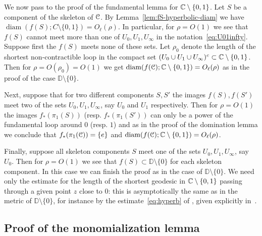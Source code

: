 \documentclass[reqno]{amsart}
\renewcommand\~[1]{\widetilde{#1}}
\def\diam{\operatorname{diam}} \def\ord{\operatorname{ord}}
\def\D{{\mathbb D}}
\begin{document}
We now pass to the proof of the fundamental lemma for
${\mathbb C}\setminus\{0,1\}$. Let $S$ be a component of the skeleton of
${\mathcal C}$. By Lemma~\ref{lem:fS-hyperbolic-diam} we have
$\diam(f(S);C\setminus\{0,1\})=O_\ell(\rho)$. In particular, for
$\rho=O(1)$ we see that $f(S)$ cannot meet more than one of
$U_0,U_1,U_\infty$ in the notation~\eqref{eq:U01infty}. Suppose first
the $f(S)$ meets none of these sets. Let $\rho_0$ denote the length of
the shortest non-contractible loop in the compact set
$(U_0\cup U_1\cup U_\infty)^c\subset{\mathbb C}\setminus\{0,1\}$. Then for
$\rho=O(\rho_0)=O(1)$ we get
$\diam(f(\cC);\C\setminus\{0,1\})=O_\ell(\rho)$ as in the proof of the
case $\D\setminus\{0\}$.

Next, suppose that for two different components $S,S'$ the images
$f(S),f(S')$ meet two of the sets $U_0,U_1,U_\infty$, say $U_0$ and
$U_1$ respectively. Then for $\rho=O(1)$ the images $f_*(\pi_1(S))$
(resp. $f_*(\pi_1(S'))$ can only be a power of the fundamental loop
around $0$ (resp. $1$) and as in the proof of the domination lemma we
conclude that $f_*(\pi_1({\mathcal C}))=\{e\}$ and
$\diam(f(\cC);\C\setminus\{0,1\})=O_\ell(\rho)$.

Finally, suppose all skeleton components $S$ meet one of the sets
$U_0,U_1,U_\infty$, say $U_0$. Then for $\rho=O(1)$ we see that
$f(S)\subset\D\setminus\{0\}$ for each skeleton component. In this
case we can finish the proof as in the case of $\D\setminus\{0\}$. We
need only the estimate for the length of the shortest geodesic in
${\mathbb C}\setminus\{0,1\}$ passing through a given point $z$ close to $0$:
this is asymptotically the same as in the metric of
$\D\setminus\{0\}$, for instance by the estimate~\eqref{eq:hyperb} of
\cite{bp:poincare}, given explicitly in~.

\subsection{Proof of the monomialization lemma}
\end{document}
